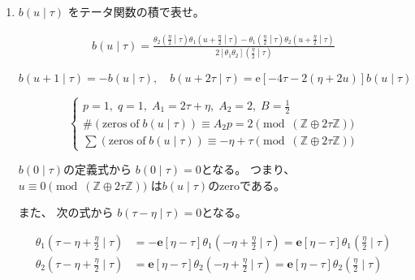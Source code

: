 \documentclass[12pt,b5paper]{ltjsarticle}
\begin{document}
\begin{enumerate}
    \item
    $b(u\mid \tau)$
    をテータ関数の積で表せ。

    \dotfill

    \begin{align}
        b(u\mid \tau) = \frac{
        \theta_{2}\left( \frac{\eta}{2} \middle| \tau \right)
        \theta_{1}\left( u+\frac{\eta}{2} \middle| \tau \right)
        -\theta_{1}\left( \frac{\eta}{2} \middle| \tau \right)
        \theta_{2}\left( u+\frac{\eta}{2} \middle| \tau \right)
        }{
        2[\theta_{1}\theta_{2}]\left( \frac{\eta}{2} \middle| \tau \right)
        }
    \end{align}

    \begin{equation}
        b(u+1 \mid \tau) = -b(u\mid \tau)
        ,\quad
        b(u+2\tau \mid \tau) = \mathrm{e}[-4\tau-2(\eta+2u)]b(u\mid \tau)
    \end{equation}

    \begin{equation}
        \begin{cases}
            p=1,\; q=1,\; A_{1}=2\tau+\eta,\; A_{2}=2,\; B=\frac{1}{2}\\
            \#(\mathrm{zeros\; of}\; b(u\mid\tau)) \equiv A_{2}p =2 \pmod{(\mathbb{Z} \oplus 2\tau\mathbb{Z})}\\
            \sum (\mathrm{zeros\; of}\; b(u\mid\tau)) \equiv -\eta + \tau \pmod{(\mathbb{Z} \oplus 2\tau\mathbb{Z})}
        \end{cases}
    \end{equation}

         $b(0\mid \tau)$の定義式から
    $b(0 \mid \tau) = 0$となる。
    つまり、
    $u\equiv 0 \pmod{(\mathbb{Z} \oplus 2\tau\mathbb{Z})}$
    は$b(u \mid \tau)$のzeroである。

    また、
         次の式から $b(\tau - \eta \mid \tau)=0$となる。

         \begin{align}
          \theta_{1}(\tau -\eta + \frac{\eta}{2} \mid \tau)
          &= - \mathbf{e}[\eta-\tau] \theta_{1} \left(-\eta + \frac{\eta}{2} \mid \tau\right)
          = \mathbf{e}[\eta-\tau] \theta_{1} \left( \frac{\eta}{2} \mid \tau \right)\\
          \theta_{2}(\tau -\eta + \frac{\eta}{2} \mid \tau)
          &= \mathbf{e}[\eta-\tau] \theta_{2}\left(-\eta + \frac{\eta}{2} \mid \tau\right)
          = \mathbf{e}[\eta-\tau] \theta_{2}\left( \frac{\eta}{2} \mid \tau\right)
         \end{align}



\end{enumerate}
\end{document}
